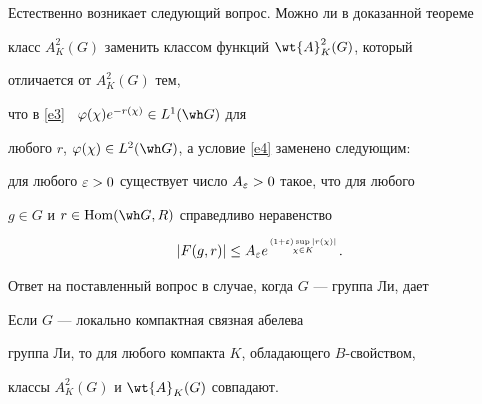 Естественно возникает следующий вопрос. Можно ли в доказанной теореме 


класс $A^2_K(G)$ заменить классом функций $\wt{A}^2_K(G)$, который 


отличается от $A^2_K(G)$ тем,


что в \eqref{e3} \ $\vp(\chi)e^{-r(\chi)}\in L^1(\gw)$ для 


любого $r$, $\vp(\chi)\in L^2(\gw)$, а условие \eqref{e4} заменено следующим:


для любого $\varepsilon>0$ существует число $A_{\varepsilon}>0$ такое, что для любого 


$g\in G$ и $r\in \mh(\gw,R)$ справедливо неравенство


\begin{equation}\label{e6}


|F(g,r)|\le A_\ve e^{{(1+\ve)}\sup\limits|r(\chi)|\atop {\chi\in K}}.


\end{equation}


Ответ на поставленный вопрос в случае, когда $G$ --- группа Ли, дает 





\begin{propnonum}


Если $G$ --- локально компактная связная абелева 


группа Ли, то для любого компакта $K$, обладающего $B$-свойством, 


классы $A^2_K(G)$ и $\wt{A}_K(G)$ совпадают.


\end{propnonum}





